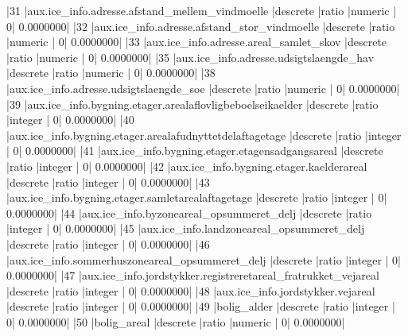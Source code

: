 \documentclass{report}
\begin{document}
\begin{Schunk}
\begin{Soutput}
|31  |aux.ice_info.adresse.afstand_mellem_vindmoelle                |descrete           |ratio          |numeric         |              0|          0.0000000|
|32  |aux.ice_info.adresse.afstand_stor_vindmoelle                  |descrete           |ratio          |numeric         |              0|          0.0000000|
|33  |aux.ice_info.adresse.areal_samlet_skov                        |descrete           |ratio          |numeric         |              0|          0.0000000|
|35  |aux.ice_info.adresse.udsigtslaengde_hav                       |descrete           |ratio          |numeric         |              0|          0.0000000|
|38  |aux.ice_info.adresse.udsigtslaengde_soe                       |descrete           |ratio          |numeric         |              0|          0.0000000|
|39  |aux.ice_info.bygning.etager.arealaflovligbeboelseikaelder     |descrete           |ratio          |integer         |              0|          0.0000000|
|40  |aux.ice_info.bygning.etager.arealafudnyttetdelaftagetage      |descrete           |ratio          |integer         |              0|          0.0000000|
|41  |aux.ice_info.bygning.etager.etagensadgangsareal               |descrete           |ratio          |integer         |              0|          0.0000000|
|42  |aux.ice_info.bygning.etager.kaelderareal                      |descrete           |ratio          |integer         |              0|          0.0000000|
|43  |aux.ice_info.bygning.etager.samletarealaftagetage             |descrete           |ratio          |integer         |              0|          0.0000000|
|44  |aux.ice_info.byzoneareal_opsummeret_delj                      |descrete           |ratio          |integer         |              0|          0.0000000|
|45  |aux.ice_info.landzoneareal_opsummeret_delj                    |descrete           |ratio          |integer         |              0|          0.0000000|
|46  |aux.ice_info.sommerhuszoneareal_opsummeret_delj               |descrete           |ratio          |integer         |              0|          0.0000000|
|47  |aux.ice_info.jordstykker.registreretareal_fratrukket_vejareal |descrete           |ratio          |integer         |              0|          0.0000000|
|48  |aux.ice_info.jordstykker.vejareal                             |descrete           |ratio          |integer         |              0|          0.0000000|
|49  |bolig_alder                                                   |descrete           |ratio          |integer         |              0|          0.0000000|
|50  |bolig_areal                                                   |descrete           |ratio          |numeric         |              0|          0.0000000|

\end{Soutput}
\end{Schunk}
\end{document}
